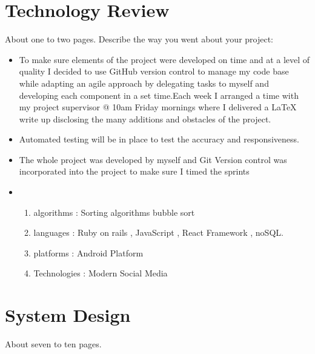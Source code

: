 \chapter{Technology Review}
About one to two pages.
Describe the way you went about your project:
\begin{itemize}
\item  %
To make sure elements of the project were developed on time and at a level of quality I decided to use GitHub version control to manage my code base while adapting an agile approach by delegating tasks to myself and developing each component in a set time.Each week I arranged a time  with my project supervisor @ 10am Friday mornings where I delivered a LaTeX write up disclosing the many additions and obstacles of the project.


\item %

Automated testing will be in place to test the accuracy and responsiveness.


\item %

The whole project was developed by myself and Git Version control was incorporated into the project to make sure I timed the sprints 


\item %



\begin{enumerate}
  \item algorithms : Sorting algorithms bubble sort
  \item languages  : Ruby on rails , JavaScript , React Framework , noSQL.  
\item platforms  : Android Platform

\item Technologies   : Modern Social Media 

\end{enumerate}

\end{itemize}

\chapter{System Design}
 About seven to ten pages.
 
